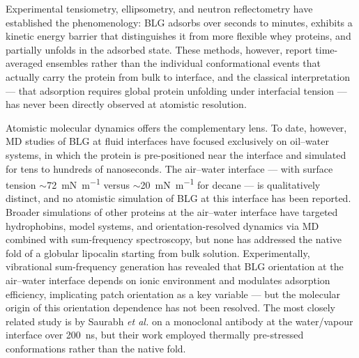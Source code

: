 \documentclass[11pt,a4paper]{article}
\begin{document}
Experimental tensiometry, ellipsometry, and neutron reflectometry have
established the phenomenology: BLG adsorbs over seconds to minutes, exhibits
a kinetic energy barrier that distinguishes it from more flexible whey
proteins, and partially unfolds in the adsorbed
state\citep{Cornec1999,Mackie1999,Ulaganathan2017a,Foam4_2020,Perriman2007}. These methods, however,
report time-averaged ensembles rather than the individual conformational
events that actually carry the protein from bulk to interface, and the
classical interpretation --- that adsorption requires global protein
unfolding under interfacial tension\citep{Graham1979} --- has never been
directly observed at atomistic resolution.

Atomistic molecular dynamics offers the complementary lens. To date, however,
MD studies of BLG at fluid interfaces have focused exclusively on
oil--water systems, in which the protein is pre-positioned near the interface
and simulated for tens to hundreds of
nanoseconds\citep{Zare2015,Zare2016}. The air--water interface --- with
surface tension $\sim$\SI{72}{\milli\newton\per\metre} versus
$\sim$\SI{20}{\milli\newton\per\metre} for decane --- is qualitatively
distinct, and no atomistic simulation of BLG at this interface has been
reported. Broader simulations of other proteins at the air--water interface
have targeted hydrophobins\citep{Magarkar2014}, model systems\citep{Euston2010,Cieplak2014},
and orientation-resolved dynamics via MD combined with sum-frequency
spectroscopy\citep{Alamdari2020}, but none has addressed the native fold of
a globular lipocalin starting from bulk solution. Experimentally,
vibrational sum-frequency generation has revealed that BLG orientation
at the air--water interface depends on ionic environment and modulates
adsorption efficiency\citep{Beierlein2015}, implicating patch orientation
as a key variable --- but the molecular origin of this orientation dependence
has not been resolved. The most closely related
study is by Saurabh \textit{et al.} on a monoclonal antibody at the
water/vapour interface over \SI{200}{\nano\second}, but their work employed
thermally pre-stressed conformations rather than the native fold\citep{Saurabh2024}.
\end{document}
